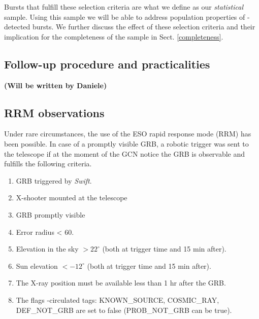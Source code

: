\documentclass{aa}    %
\newcommand\todo[1]{\textbf{(#1)}}
\begin{document}
Bursts that fulfill these selection criteria are what we define as our
\textit{statistical} sample. Using this sample we will be able to address
population properties of \swift-detected bursts. We further discuss the effect
of these selection criteria and their implication for the completeness of the
sample in Sect. \ref{completeness}.

\subsection{Follow-up procedure and practicalities}

\todo{Will be written by Daniele}



\subsection{RRM observations} \label{RRM}

Under rare circumstances, the use of the ESO rapid response mode (RRM) has been
possible. In case of a promptly visible GRB, a robotic trigger was sent to the
telescope if at the moment of the GCN notice the GRB is observable and fulfills
the following criteria.


\begin{enumerate}
	\item GRB triggered by \textit{Swift}.
	\item X-shooter mounted at the telescope
	\item GRB promptly visible
	\item Error radius < 60\arcsec.
	\item Elevation in the sky $> 22^\circ$ (both at trigger time and 15 min after).
	\item Sun elevation $< -12^\circ$ (both at trigger time and 15 min after).
	\item The X-ray position must be available less than 1 hr after the GRB.
	\item The flags \swift-circulated tags: KNOWN\_SOURCE, COSMIC\_RAY, DEF\_NOT\_GRB are set to false (PROB\_NOT\_GRB can be true).
\end{enumerate}
\end{document}
